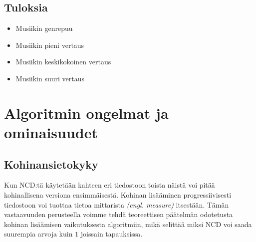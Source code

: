 \documentclass[12pt,finnish]{tktltiki2}
\theoremstyle{definition}
\theoremstyle{remark}
\newcommand{\engl}[1]{\emph{(engl. #1)}}
\begin{document}
    \subsection{Tuloksia} %
    \label{sub:tuloksia}
      \begin{itemize}
        \item Musiikin genrepuu
        \item Musiikin pieni vertaus
        \item Musiikin keskikokoinen vertaus
        \item Musiikin suuri vertaus
      \end{itemize}


\section{Algoritmin ongelmat ja ominaisuudet} %
\label{sec:algoritmin_ongelmat_ja_ominaisuudet}
  \subsection{Kohinansietokyky} %
  \label{sub:kohinansietokyky}

    Kun NCD:tä käytetään kahteen eri tiedostoon toista näistä voi pitää kohinallisena versiona ensimmäisestä.
    Kohinan lisääminen progressiivisesti tiedostoon voi tuottaa tietoa mittarista \engl{measure} itsestään.
    Tämän vastaavuuden perusteella voimme tehdä teoreettisen päätelmän odotetusta kohinan lisäämisen vaikutuksesta algoritmiin, mikä selittää miksi NCD voi saada suurempia arvoja kuin $1$ joissain tapauksissa. \cite{4167725}
\end{document}
